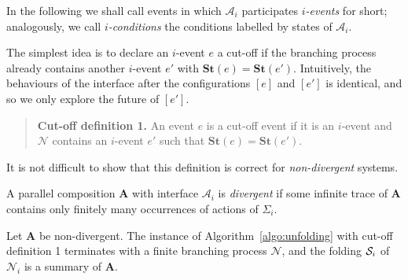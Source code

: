 \documentclass{llncs}
\def\A{\mathcal{A}}
\def\prod{\mathbf{A}}
\def\N{\mathcal{N}}
\def\S{\mathcal{S}}
\newcommand{\st}[1]{\mathbf{St}(#1)}
\renewcommand{\S}{{\cal S}}
\begin{document}
In the following we shall call events in which $\A_i$ participates
{\em $i$-events} for short; analogously, we call {\em $i$-conditions} the 
conditions labelled by states of $\A_i$.

The simplest idea is to declare an $i$-event $e$ a cut-off if the 
branching process already contains another $i$-event $e'$ with $\st{e}=\st{e'}$. Intuitively, the behaviours of the interface after the configurations $[e]$ and $[e']$ is identical, and so we only explore the future of $[e']$.

\begin{quote}
{\bf Cut-off definition 1.} An event $e$ is a cut-off event 
if it is an $i$-event and $\N$ contains an $i$-event $e'$ such that
 $\st{e}=\st{e'}$. 
\end{quote}

It is not difficult to show that this definition is correct for 
{\em non-divergent} systems.

\begin{definition}
A parallel composition $\prod$ with interface $\A_i$ is 
{\em divergent} if some infinite trace of $\prod$ contains only finitely many occurrences of actions of $\Sigma_i$. 
\end{definition}

\begin{theorem}
\label{th:interfacefair}
Let $\prod$ be non-divergent. The instance of Algorithm~\ref{algo:unfolding} with cut-off definition 1 terminates with a finite branching process $\N$, and the folding $\S_i$ of $\N_i$ is a summary of $\prod$.
\end{theorem}
\end{document}

